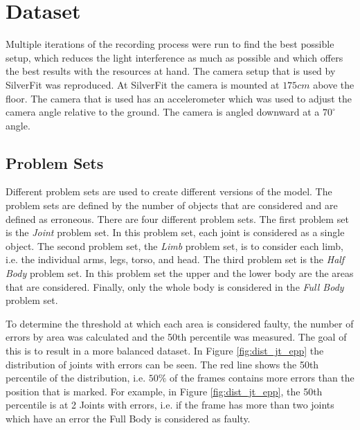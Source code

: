 \section{Dataset}

Multiple iterations of the recording process were run to find the best possible setup, which reduces the light interference as much as possible and which offers the best results with the resources at hand. The camera setup that is used by SilverFit was reproduced. At SilverFit the camera is mounted at $175cm$ above the floor. The camera that is used has an accelerometer which was used to adjust the camera angle relative to the ground. The camera is angled downward at a $70^\circ$ angle. 

\subsection{Problem Sets}
\label{sec:problem_set}

Different problem sets are used to create different versions of the model. The problem sets are defined by the number of objects that are considered and are defined as erroneous. There are four different problem sets. The first problem set is the \textit{Joint} problem set. In this problem set, each joint is considered as a single object. The second problem set,  the \textit{Limb} problem set, is to consider each limb, i.e. the individual arms, legs, torso, and head. The third problem set is the \textit{Half Body} problem set. In this problem set the upper and the lower body are the areas that are considered. Finally, only the whole body is considered in the \textit{Full Body} problem set.

To determine the threshold at which each area is considered faulty, the number of errors by area was calculated and the 50th percentile was measured. The goal of this is to result in a more balanced dataset. In Figure \ref{fig:dist_jt_epp} the distribution of joints with errors can be seen. The red line shows the 50th percentile of the distribution, i.e. $50\%$ of the frames contains more errors than the position that is marked. For example, in Figure \ref{fig:dist_jt_epp}, the 50th percentile is at 2 Joints with errors, i.e. if the frame has more than two joints which have an error the Full Body is considered as faulty.

